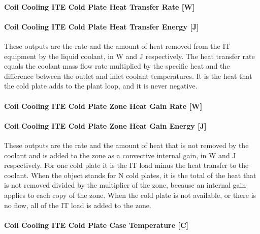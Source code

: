 \paragraph{Coil Cooling ITE Cold Plate Heat Transfer Rate {[}W{]}}\label{coil-cooling-ite-cold-plate-heat-transfer-rate-w}

\paragraph{Coil Cooling ITE Cold Plate Heat Transfer Energy {[}J{]}}\label{coil-cooling-ite-cold-plate-heat-transfer-energy-j}

These outputs are the rate and the amount of heat removed from the IT equipment by the liquid coolant, in W and J respectively. The heat transfer rate equals the coolant mass flow rate multiplied by the specific heat and the difference between the outlet and inlet coolant temperatures. It is the heat that the cold plate adds to the plant loop, and it is never negative.

\paragraph{Coil Cooling ITE Cold Plate Zone Heat Gain Rate {[}W{]}}\label{coil-cooling-ite-cold-plate-zone-heat-gain-rate-w}

\paragraph{Coil Cooling ITE Cold Plate Zone Heat Gain Energy {[}J{]}}\label{coil-cooling-ite-cold-plate-zone-heat-gain-energy-j}

These outputs are the rate and the amount of heat that is not removed by the coolant and is added to the zone as a convective internal gain, in W and J respectively. For one cold plate it is the IT load minus the heat transfer to the coolant. When the object stands for N cold plates, it is the total of the heat that is not removed divided by the multiplier of the zone, because an internal gain applies to each copy of the zone. When the cold plate is not available, or there is no flow, all of the IT load is added to the zone.

\paragraph{Coil Cooling ITE Cold Plate Case Temperature {[}C{]}}\label{coil-cooling-ite-cold-plate-case-temperature-c}

